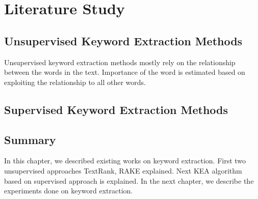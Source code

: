 \chapter{Literature Study}

\section{Unsupervised Keyword Extraction Methods}
Unsupervised keyword extraction methods mostly rely on the relationship between the words in the text. Importance of the word is estimated based on exploiting the relationship to all other words. 





\pagebreak

\section{Supervised Keyword Extraction Methods}




\pagebreak



\section{Summary}
In this chapter, we described existing works on keyword extraction. First two unsupervised approaches TextRank, RAKE explained. Next KEA algorithm based on supervised approach is explained. In the next chapter, we describe the experiments done on keyword extraction.



